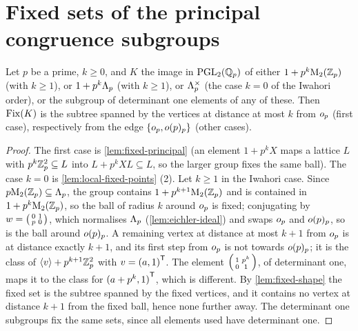 \section{Fixed sets of the principal congruence subgroups}

\begin{lemma}\label{lem:fixed-principal-iwahori}
Let $p$ be a prime, $k \geq 0$, and $K$ the image in $\PGL{2}{\pAdicNumbers{p}}$
of either $1 + p^k\mathrm{M}_{2}(\mathbb{Z}_{p})$ (with $k \geq 1$), or
$1 + p^k\Lambda_{p}$ (with $k \geq 1$), or $\Lambda_{p}^{\times}$ (the
case $k = 0$ of the Iwahori order), or the subgroup of determinant one
elements of any of these. Then $\mathrm{Fix}(K)$ is the subtree spanned by the
vertices at distance at most $k$ from $o_{p}$ (first case),
respectively from the edge $\{o_{p}, o(p)_{p}\}$
(other cases).
\end{lemma}

\begin{proof}
The first case is \cref{lem:fixed-principal} (an element $1 + p^kX$ maps a
lattice $L$ with $p^k\mathbb{Z}_{p}^2 \subseteq L$ into
$L + p^kXL \subseteq L$, so the larger group fixes the same ball). The case
$k = 0$ is \cref{lem:local-fixed-points} (2). Let $k \geq 1$ in the Iwahori
case. Since $p\mathrm{M}_{2}(\mathbb{Z}_{p}) \subseteq \Lambda_{p}$, the
group contains $1 + p^{k+1}\mathrm{M}_{2}(\mathbb{Z}_{p})$ and is contained
in $1 + p^k\mathrm{M}_{2}(\mathbb{Z}_{p})$, so the ball of radius $k$ around
$o_{p}$ is fixed; conjugating by $w = \left(\begin{smallmatrix} 0 & 1 \\ p & 0 \end{smallmatrix}\right)$,
which normalises $\Lambda_{p}$ (\cref{lem:eichler-ideal}) and swaps
$o_{p}$ and $o(p)_{p}$, so is the ball around
$o(p)_{p}$. A remaining vertex at distance at most $k+1$ from
$o_{p}$ is at distance exactly $k+1$, and its first step from
$o_{p}$ is not towards $o(p)_{p}$; it is the class
of $\langle v\rangle + p^{k+1}\mathbb{Z}_{p}^2$ with $v = {(a, 1)}^{\mathsf{T}}$.
The element $\left(\begin{smallmatrix} 1 & p^k \\ 0 & 1 \end{smallmatrix}\right)$, of determinant one, maps it to the class
for ${(a + p^k, 1)}^{\mathsf{T}}$, which is different. By \cref{lem:fixed-shape}
the fixed set is the subtree spanned by the fixed vertices, and it contains
no vertex at distance $k+1$ from the fixed ball, hence none further away.
The determinant one subgroups fix the same sets, since all elements used
have determinant one.
\end{proof}

